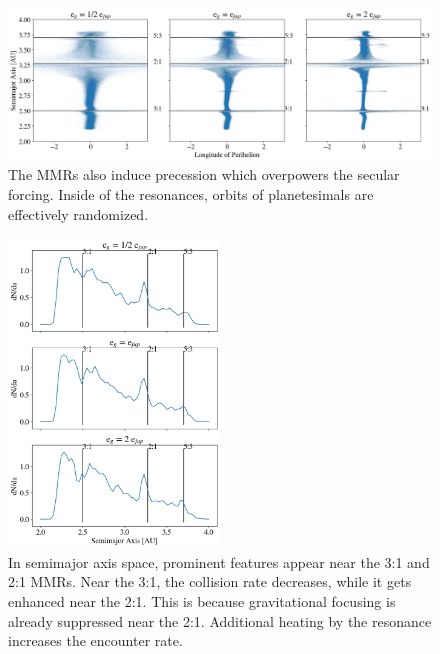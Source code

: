 \documentclass[onecolumn]{aastex63}
\begin{document}
\begin{figure}
\begin{center}
    \includegraphics[width=\textwidth]{figures/long_ph.png}
    \caption{The MMRs also induce precession which overpowers the secular forcing. Inside of the resonances, orbits of
    planetesimals are effectively randomized.\label{fig:long_ph}}
\end{center}
\end{figure}

\begin{figure}
\begin{center}
    \includegraphics[width=0.5\textwidth]{figures/coll_hist_a.png}
    \caption{In semimajor axis space, prominent features appear near the 3:1 and 2:1 MMRs. Near the 3:1, the collision
    rate decreases, while it gets enhanced near the 2:1. This is because gravitational focusing is already suppressed
    near the 2:1. Additional heating by the resonance increases the encounter rate.\label{fig:coll_hist_a}}
\end{center}
\end{figure}
\end{document}
